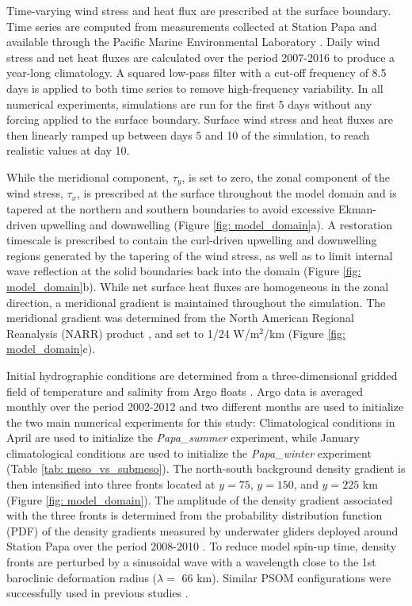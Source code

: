 \documentclass[article,linenumbers]{agujournal2018}
\begin{document}
	Time-varying wind stress and heat flux are prescribed at the surface boundary. Time series are computed from measurements collected at Station Papa and available through the Pacific Marine Environmental Laboratory \citep{PMEL_data}. Daily wind stress and net heat fluxes are calculated over the period 2007-2016 to produce a year-long climatology. A squared low-pass filter with a cut-off frequency of 8.5 days is applied to both time series to remove high-frequency variability. In all numerical experiments, simulations are 
	run for the first 5 days without any forcing applied to the surface boundary. Surface wind stress and heat fluxes are then linearly ramped up between days 5 and 10 of the simulation, to reach realistic values at day 10.
	
	While the meridional component, $\tau_y$, is set to zero, the zonal component of the wind stress, $\tau_x$, is prescribed at the surface throughout the model domain and is tapered at the northern and southern boundaries to avoid excessive Ekman-driven upwelling and downwelling (Figure \ref{fig: model_domain}a). A restoration timescale is prescribed to contain the curl-driven upwelling and downwelling regions generated by the tapering of the wind stress, as well as to limit internal wave reflection at the solid boundaries back into the domain (Figure \ref{fig: model_domain}b). While net surface heat fluxes are homogeneous in the zonal direction, a meridional gradient is maintained throughout the simulation. The meridional gradient was determined from the North American Regional Reanalysis (NARR) product \citep{Mesinger_2006}, and set to 1/24 W/m$^2$/km (Figure \ref{fig: model_domain}c).
	
	Initial hydrographic conditions are determined from a three-dimensional gridded field of temperature and salinity from Argo floats \citep{Gaillard_2015,Gaillard_2016}. Argo data is averaged monthly over the period 2002-2012 and two different months are used to initialize the two main numerical experiments for this study: Climatological conditions in April are used to initialize the \textit{Papa\_summer} experiment, while January climatological conditions are used to initialize the \textit{Papa\_winter} experiment (Table \ref{tab: meso_vs_submeso}). The north-south background density gradient is then intensified into three fronts located at $y = 75$, $y = 150$, and $y = 225$ km (Figure \ref{fig: model_domain}). The amplitude of the density gradient associated with the three fronts is determined from the probability distribution function (PDF) of the density gradients measured by underwater gliders deployed around Station Papa over the period 2008-2010 \citep{Pelland_2016,Pelland_2018_data}. To reduce model spin-up time, density fronts are perturbed by a sinusoidal wave with a wavelength close to the 1st baroclinic deformation radius ($\lambda = $ 66 km). Similar PSOM configurations were successfully used in previous studies \citep{Mahadevan_2012,Omand_2015}.
	
\end{document}
